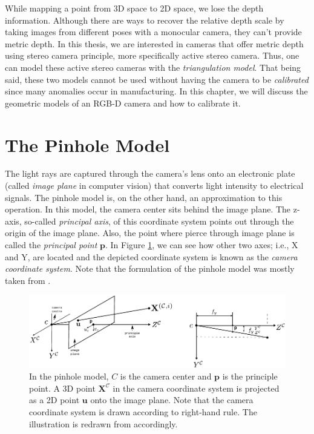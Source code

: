 \documentclass[12pt]{report}
\numberwithin{figure}{section}
\begin{document}
While mapping a point from 3D space to 2D space, we lose the 
depth information.  Although there are ways to recover the relative depth 
scale by 
taking images from different poses with a monocular camera, they can't provide 
metric depth.  In this thesis, we are interested in cameras that offer metric 
depth using stereo camera principle, more specifically active stereo camera. 
Thus, one 
can 
model these active stereo cameras with the \textit{triangulation model}. That 
being said, these two models cannot be used without having the camera to be 
\textit{calibrated} since many anomalies occur in manufacturing. In this 
chapter, we will discuss the geometric models of an RGB-D camera and how 
to calibrate it.


\section{The Pinhole Model} \label{sc_pinhole}

The light rays are captured through the camera's lens onto an electronic plate 
(called \textit{image plane} in computer vision) that converts light intensity 
to electrical signals.  The pinhole model is, on the other hand, an 
approximation to this operation.  In this model, the camera 
center sits behind the image plane.  The z-axis, so-called \textit{principal 
axis}, of this coordinate system points out through the origin of the image 
plane. Also, the point where pierce through image plane is called the 
\textit{principal point} $\mathbf{p}$. In Figure \ref{fig:pinhole}, we can see 
how other two axes; 
i.e., X and Y, are located and the depicted coordinate system is known as 
the \textit{camera coordinate system}. Note that the formulation of the 
pinhole model was mostly taken from \parencite{RichardHartley2003}.


\begin{figure}[H]
	\centering
	\includegraphics[width=\linewidth,natwidth=640,natheight=640]
  {fig/drawings/pinhole_3d2d.pdf}
  \caption[The Pinhole Model]{In the pinhole model, $C$ is the camera center 
  and $\mathbf{p}$ is the principle point. A 3D point 
  $\mathbf{X^{\mathcal{C}}}$ in the 
  camera coordinate system is projected as a 2D point $\mathbf{u}$ onto the 
  image plane. Note that the camera coordinate system is drawn according to 
  right-hand rule. The illustration is redrawn from 
  \parencite{RichardHartley2003} 
  accordingly.}
	\label{fig:pinhole}
\end{figure}
\end{document}
